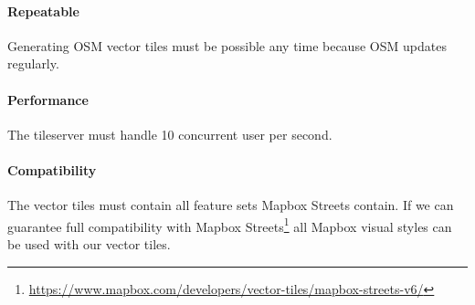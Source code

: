 \paragraph{Repeatable}

Generating OSM vector tiles must be possible any time because OSM
updates regularly.

\paragraph{Performance}

The tileserver must handle 10 concurrent user per second.

\paragraph{Compatibility}

The vector tiles must contain all feature sets Mapbox Streets contain. If we can guarantee full compatibility with Mapbox Streets\footnote{\url{https://www.mapbox.com/developers/vector-tiles/mapbox-streets-v6/}} all Mapbox visual styles can be used with our vector tiles.
